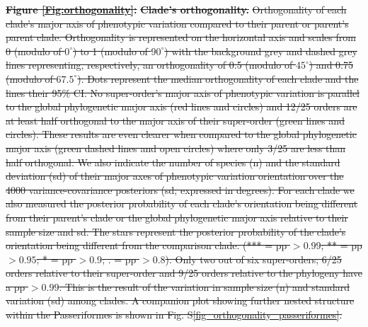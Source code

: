 \documentclass[12pt,letterpaper]{article}
\providecommand{\DIFdeltex}[1]{{\protect\color{red}\sout{#1}}}                      %
\providecommand{\DIFdel}[1]{\texorpdfstring{\DIFdeltex{#1}}{}} %
\begin{document}
\textbf{\DIFdel{Figure \ref{Fig:orthogonality}:}}
\textbf{\DIFdel{Clade's orthogonality.}}
\DIFdel{Orthogonality of each clade's major axis of phenotypic variation compared to their parent or parent's parent clade.
Orthogonality is represented on the horizontal axis and scales from 0 (modulo of $0^\circ$) to 1 (modulo of $90^\circ$) with the background grey and dashed grey lines representing, respectively, an orthogonality of 0.5 (modulo of $45^\circ$) and 0.75 (modulo of $67.5^\circ$).
Dots represent the median orthogonality of each clade and the lines their 95\% CI.
No super-order's major axis of phenotypic variation is parallel to the global phylogenetic major axis (red lines and circles) and 12/25 orders are at least half orthogonal to the major axis of their super-order (green lines and circles).
These results are even clearer when compared to the global phylogenetic major axis (green dashed lines and open circles) where only 3/25 are less than half orthogonal.
We also indicate the number of species (n) and the standard deviation (sd) of their major axes of phenotypic variation orientation over the 4000 variance-covariance posteriors (sd; expressed in degrees).
For each clade we also measured the posterior probability of each clade's orientation being different from their parent's clade or the global phylogenetic major axis relative to their sample size and sd.
The stars represent the posterior probability of the clade's orientation being different from the comparison clade. (*** = pp $> 0.99$; ** = pp $>0.95$; * = pp $> 0.9$; . = pp $> 0.8$).
Only two out of six super-orders; 6/25 orders relative to their super-order and 9/25 orders relative to the phylogeny have a pp $> 0.99$.
This is the result of the variation in sample size (n) and standard variation (sd) among clades. 
A companion plot showing further nested structure within the Passeriformes is shown in Fig. S\ref{fig_orthogonality_passeriformes}.
}%

\end{document}
